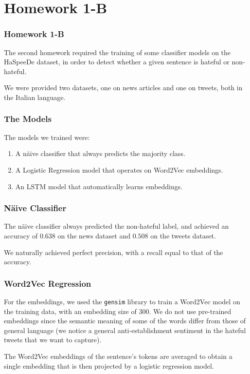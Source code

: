 \documentclass[english, xcolor={table,usenames}]{beamer}
\begin{document}
\section{Homework 1-B}

\begin{frame}
  \frametitle{Homework 1-B}

  The second homework required the training of some classifier models on the HaSpeeDe dataset,
  in order to detect whether a given sentence is \alert{hateful} or \alert{non-hateful}.

  We were provided \alert{two} datasets, one on news articles and one on tweets, both in
  the Italian language.
\end{frame}

\begin{frame}
  \frametitle{The Models}

  The models we trained were:

  \begin{enumerate}
    \item<1-> A näive classifier that always predicts the majority class.
    \item<2-> A Logistic Regression model that operates on Word2Vec embeddings.
    \item<3-> An LSTM model that automatically learns embeddings.
  \end{enumerate}

\end{frame}

\begin{frame}
  \frametitle{Näive Classifier}

  The näive classifier always predicted the \alert{non-hateful} label, and achieved
  an accuracy of $0.638$ on the news dataset and $0.508$ on the tweets dataset.

  We naturally achieved \alert{perfect} precision, with a recall equal to that
  of the accuracy.
\end{frame}

\begin{frame}
  \frametitle{Word2Vec Regression}

  For the embeddings, we used the \texttt{gensim} library to train a Word2Vec model
  on the training data, with an embedding size of $300$. We do \alert{not} use pre-trained embeddings since the semantic meaning of
  some of the words differ from those of general language (we notice a general anti-establishment
  sentiment in the hateful tweets that we want to capture).

  The Word2Vec embeddings of the sentence's tokens are averaged to obtain a single embedding
  that is then projected by a logistic regression model.
\end{frame}
\end{document}
